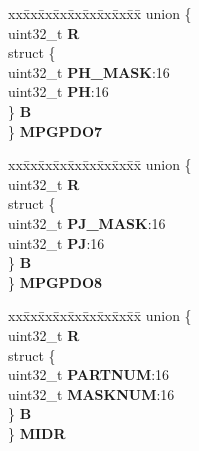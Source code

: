 \begin{DoxyCompactItemize}
\begin{tabbing}
\end{tabbing}\item 
\mbox{\label{structSIU__tag_a2b933e48199697e51c7bb3a551e109b4}} 
\begin{tabbing}
xx\=xx\=xx\=xx\=xx\=xx\=xx\=xx\=xx\=\kill
union \{\\
\>uint32\_t {\bfseries R}\\
\>struct \{\\
\>\>uint32\_t {\bfseries PH\_MASK}:16\\
\>\>uint32\_t {\bfseries PH}:16\\
\>\} {\bfseries B}\\
\} {\bfseries MPGPDO7}\\

\end{tabbing}\item 
\mbox{\label{structSIU__tag_a75a427c30538917501e8490a008d7638}} 
\begin{tabbing}
xx\=xx\=xx\=xx\=xx\=xx\=xx\=xx\=xx\=\kill
union \{\\
\>uint32\_t {\bfseries R}\\
\>struct \{\\
\>\>uint32\_t {\bfseries PJ\_MASK}:16\\
\>\>uint32\_t {\bfseries PJ}:16\\
\>\} {\bfseries B}\\
\} {\bfseries MPGPDO8}\\

\end{tabbing}\item 
\mbox{\label{structSIU__tag_a254f0856cecf095487d7c11229182d5d}} 
\begin{tabbing}
xx\=xx\=xx\=xx\=xx\=xx\=xx\=xx\=xx\=\kill
union \{\\
\>uint32\_t {\bfseries R}\\
\>struct \{\\
\>\>uint32\_t {\bfseries PARTNUM}:16\\
\>\>uint32\_t {\bfseries MASKNUM}:16\\
\>\} {\bfseries B}\\
\} {\bfseries MIDR}\\


\end{tabbing}
\end{DoxyCompactItemize}
